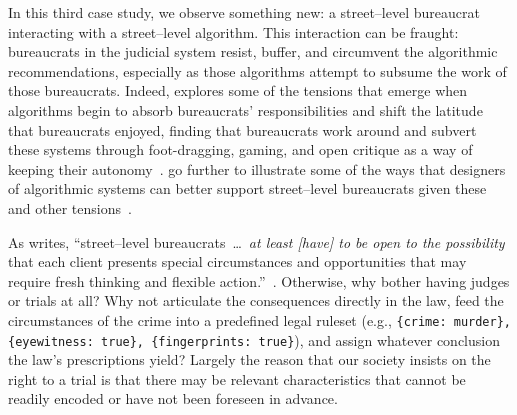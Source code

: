 \documentclass[street-level_algorithms]{subfiles}
\begin{document}
In this third case study, we observe something new: a street--level bureaucrat interacting with a street--level algorithm.
This interaction can be fraught:
bureaucrats in the judicial system resist, buffer, and circumvent
the algorithmic recommendations, especially as those algorithms attempt to subsume the work of those bureaucrats.
Indeed, \citeauthor{doi:10.1177/2053951717718855} explores some of the tensions that emerge
when algorithms begin to absorb bureaucrats' responsibilities and shift the latitude that bureaucrats enjoyed,
finding that bureaucrats work around and subvert these systems through
foot-dragging, gaming, and open critique as a way of keeping their autonomy~\cite{doi:10.1177/2053951717718855}.
\citeauthor{Veale:2018:FAD:3173574.3174014} go further to illustrate some of the ways that
designers of algorithmic systems can better support
street--level bureaucrats given these and other tensions~\cite{Veale:2018:FAD:3173574.3174014}.

As \citeauthor{lipsky1983street} writes,
``street--level bureaucrats~\dots~\textit{at least [have] to be open to the possibility}
that each client presents special circumstances and opportunities
that may require fresh thinking and flexible action.''~\cite{lipsky1983street}.
Otherwise, why bother having judges or trials at all?
Why not articulate the consequences directly in the law,
feed the circumstances of the crime into a predefined legal ruleset
(e.g., \texttt{\{crime: murder\}, \{eyewitness: true\}, \{fingerprints: true\}}), and
assign whatever conclusion the law's prescriptions yield?
Largely the reason that our society insists on the right to a trial is that
there may be relevant characteristics that cannot be readily encoded or have not been foreseen in advance.
\end{document}
